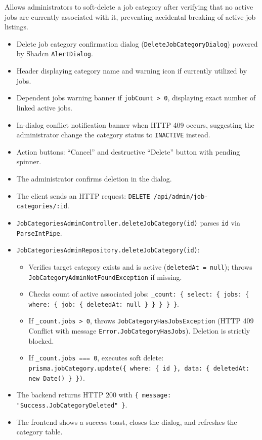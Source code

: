 \noindent Allows administrators to soft-delete a job category after verifying that no active jobs are currently associated with it, preventing accidental breaking of active job listings.

\begin{itemize}[leftmargin=1.6em,topsep=3pt,itemsep=2pt,parsep=0pt,label=$\bullet$]
    \item Delete job category confirmation dialog (\texttt{DeleteJobCategoryDialog}) powered by Shadcn \texttt{AlertDialog}.
    \item Header displaying category name and warning icon if currently utilized by jobs.
    \item Dependent jobs warning banner if \texttt{jobCount > 0}, displaying exact number of linked active jobs.
    \item In-dialog conflict notification banner when HTTP 409 occurs, suggesting the administrator change the category status to \texttt{INACTIVE} instead.
    \item Action buttons: ``Cancel'' and destructive ``Delete'' button with pending spinner.
\end{itemize}

\begin{itemize}[leftmargin=1.6em,topsep=3pt,itemsep=2pt,parsep=0pt,label=$\bullet$]
    \item The administrator confirms deletion in the dialog.
    \item The client sends an HTTP request: \texttt{DELETE /api/admin/job-categories/:id}.
    \item \texttt{JobCategoriesAdminController.deleteJobCategory(id)} parses \texttt{id} via \texttt{ParseIntPipe}.
    \item \texttt{JobCategoriesAdminRepository.deleteJobCategory(id)}:
        \begin{itemize}[leftmargin=1.6em,topsep=2pt,itemsep=2pt,parsep=0pt]
            \item Verifies target category exists and is active (\texttt{deletedAt = null}); throws \texttt{JobCategory\-Admin\-Not\-Found\-Exception} if missing.
            \item Checks count of active associated jobs: \texttt{\_count: \{ select: \{ jobs: \{ where: \{ job: \{ deletedAt: null \} \} \} \} \}}.
            \item If \texttt{\_count.jobs > 0}, throws \texttt{JobCategory\-HasJobs\-Exception} (HTTP 409 Conflict with message \texttt{Error.JobCategoryHasJobs}). Deletion is strictly blocked.
            \item If \texttt{\_count.jobs === 0}, executes soft delete: \texttt{prisma.jobCategory.update(\{ where: \{ id \}, data: \{ deletedAt: new Date() \} \})}.
        \end{itemize}
    \item The backend returns HTTP 200 with \texttt{\{ message: "Success.JobCategoryDeleted" \}}.
    \item The frontend shows a success toast, closes the dialog, and refreshes the category table.
\end{itemize}


